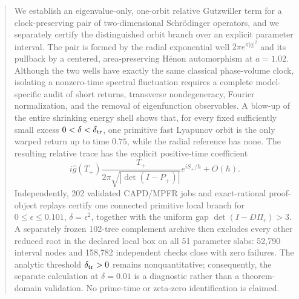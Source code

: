 \begin{abstract}
We establish an eigenvalue-only, one-orbit relative Gutzwiller term for a
clock-preserving pair of two-dimensional Schr\"odinger operators, and we
separately certify the distinguished orbit branch over an explicit parameter
interval.  The pair is formed by the radial exponential well
\(2\pi e^{\pi|q|^2}\) and its pullback by a centered, area-preserving H\'enon
automorphism at \(a=1.02\).  Although the two wells have exactly the same
classical phase-volume clock, isolating a nonzero-time spectral fluctuation
requires a complete model-specific audit of short returns, transverse
nondegeneracy, Fourier normalization, and the removal of eigenfunction
observables.  A blow-up of the entire shrinking energy shell shows that, for
every fixed sufficiently small excess \(0<\delta<\delta_{\rm tr}\), one
primitive fast Lyapunov orbit is the only warped return up to time \(0.75\),
while the radial reference has none.  The resulting relative trace has the
explicit positive-time coefficient
\[
 i\widehat g(T_+)\frac{T_+}{2\pi\sqrt{|\det(I-P_+)|}}e^{iS_+/\hbar}
 +O(\hbar).
\]
Independently, 202 validated CAPD/MPFR jobs and exact-rational proof-object
replays certify one connected primitive local branch for
\(0\le\epsilon\le0.101\), \(\delta=\epsilon^2\), together with the uniform
gap \(\det(I-D\Pi_\epsilon)>3\).  A separately frozen 102-tree complement
archive then excludes every other reduced root in the declared local box on
all 51 parameter slabs: 52,790 interval nodes and 158,782 independent checks
close with zero failures.  The analytic threshold
\(\delta_{\rm tr}>0\) remains nonquantitative; consequently, the separate
calculation at \(\delta=0.01\) is a diagnostic rather than a theorem-domain
validation.  No prime-time or zeta-zero identification is claimed.
\end{abstract}
